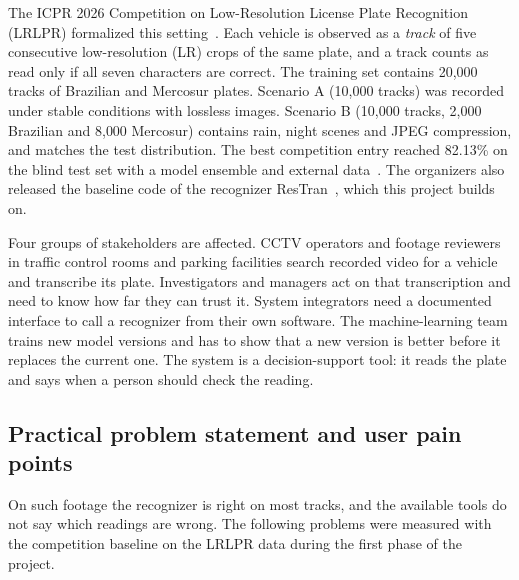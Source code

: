 \documentclass[11pt,a4paper]{article}
\begin{document}
The ICPR 2026 Competition on Low-Resolution License Plate Recognition (LRLPR) formalized this setting~\cite{laroca2026icpr}. Each vehicle is observed as a \emph{track} of five consecutive low-resolution (LR) crops of the same plate, and a track counts as read only if all seven characters are correct. The training set contains 20{,}000 tracks of Brazilian and Mercosur plates. Scenario A (10{,}000 tracks) was recorded under stable conditions with lossless images. Scenario B (10{,}000 tracks, 2{,}000 Brazilian and 8{,}000 Mercosur) contains rain, night scenes and JPEG compression, and matches the test distribution. The best competition entry reached 82.13\% on the blind test set with a model ensemble and external data~\cite{laroca2026icpr}. The organizers also released the baseline code of the recognizer ResTran~\cite{baselinecode}, which this project builds on.

Four groups of stakeholders are affected. CCTV operators and footage reviewers in traffic control rooms and parking facilities search recorded video for a vehicle and transcribe its plate. Investigators and managers act on that transcription and need to know how far they can trust it. System integrators need a documented interface to call a recognizer from their own software. The machine-learning team trains new model versions and has to show that a new version is better before it replaces the current one. The system is a decision-support tool: it reads the plate and says when a person should check the reading.

\subsection{Practical problem statement and user pain points}

On such footage the recognizer is right on most tracks, and the available tools do not say which readings are wrong. The following problems were measured with the competition baseline on the LRLPR data during the first phase of the project.
\end{document}
